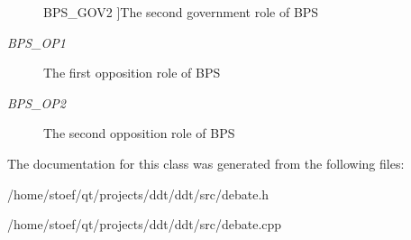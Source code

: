 \begin{Desc}
\begin{description}
{\hypertarget{classDebate_ae9871a36a2f3de7a7da8922d70fbece4a519b0f35d90b536816035fa9fa1e52f7}{B\-P\-S\-\_\-\-G\-O\-V2}\label{classDebate_ae9871a36a2f3de7a7da8922d70fbece4a519b0f35d90b536816035fa9fa1e52f7}
}]The second government role of B\-P\-S \item[{\em 
\hypertarget{classDebate_ae9871a36a2f3de7a7da8922d70fbece4a950ec765be37e52b2b93e5cfc619048d}{B\-P\-S\-\_\-\-O\-P1}\label{classDebate_ae9871a36a2f3de7a7da8922d70fbece4a950ec765be37e52b2b93e5cfc619048d}
}]The first opposition role of B\-P\-S \item[{\em 
\hypertarget{classDebate_ae9871a36a2f3de7a7da8922d70fbece4a09554f5050ad1a7de30cdfab1a4bb463}{B\-P\-S\-\_\-\-O\-P2}\label{classDebate_ae9871a36a2f3de7a7da8922d70fbece4a09554f5050ad1a7de30cdfab1a4bb463}
}]The second opposition role of B\-P\-S \end{description}
\end{Desc}


The documentation for this class was generated from the following files\-:\begin{DoxyCompactItemize}
\item 
/home/stoef/qt/projects/ddt/ddt/src/debate.\-h\item 
/home/stoef/qt/projects/ddt/ddt/src/debate.\-cpp\end{DoxyCompactItemize}
